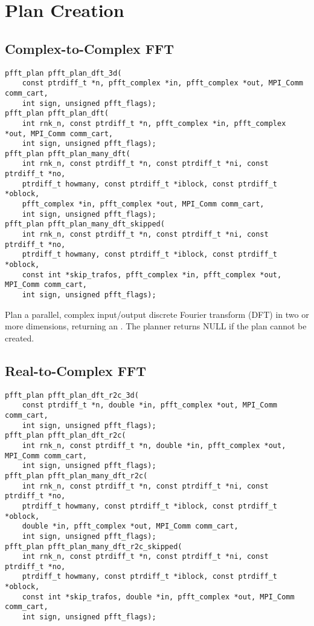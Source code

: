 \section{Plan Creation}\label{sec:create-plan}

\subsection{Complex-to-Complex FFT}
\begin{lstlisting}
pfft_plan pfft_plan_dft_3d(
    const ptrdiff_t *n, pfft_complex *in, pfft_complex *out, MPI_Comm comm_cart,
    int sign, unsigned pfft_flags);
pfft_plan pfft_plan_dft(
    int rnk_n, const ptrdiff_t *n, pfft_complex *in, pfft_complex *out, MPI_Comm comm_cart,
    int sign, unsigned pfft_flags);
pfft_plan pfft_plan_many_dft(
    int rnk_n, const ptrdiff_t *n, const ptrdiff_t *ni, const ptrdiff_t *no,
    ptrdiff_t howmany, const ptrdiff_t *iblock, const ptrdiff_t *oblock,
    pfft_complex *in, pfft_complex *out, MPI_Comm comm_cart,
    int sign, unsigned pfft_flags);
pfft_plan pfft_plan_many_dft_skipped(
    int rnk_n, const ptrdiff_t *n, const ptrdiff_t *ni, const ptrdiff_t *no,
    ptrdiff_t howmany, const ptrdiff_t *iblock, const ptrdiff_t *oblock,
    const int *skip_trafos, pfft_complex *in, pfft_complex *out, MPI_Comm comm_cart,
    int sign, unsigned pfft_flags);
\end{lstlisting}

Plan a parallel, complex input/output discrete Fourier transform (DFT) in two or more dimensions, returning an .
The planner returns NULL if the plan cannot be created.

\subsection{Real-to-Complex FFT}
\begin{lstlisting}
pfft_plan pfft_plan_dft_r2c_3d(
    const ptrdiff_t *n, double *in, pfft_complex *out, MPI_Comm comm_cart,
    int sign, unsigned pfft_flags);
pfft_plan pfft_plan_dft_r2c(
    int rnk_n, const ptrdiff_t *n, double *in, pfft_complex *out, MPI_Comm comm_cart,
    int sign, unsigned pfft_flags);
pfft_plan pfft_plan_many_dft_r2c(
    int rnk_n, const ptrdiff_t *n, const ptrdiff_t *ni, const ptrdiff_t *no,
    ptrdiff_t howmany, const ptrdiff_t *iblock, const ptrdiff_t *oblock,
    double *in, pfft_complex *out, MPI_Comm comm_cart,
    int sign, unsigned pfft_flags);
pfft_plan pfft_plan_many_dft_r2c_skipped(
    int rnk_n, const ptrdiff_t *n, const ptrdiff_t *ni, const ptrdiff_t *no,
    ptrdiff_t howmany, const ptrdiff_t *iblock, const ptrdiff_t *oblock,
    const int *skip_trafos, double *in, pfft_complex *out, MPI_Comm comm_cart,
    int sign, unsigned pfft_flags);
\end{lstlisting}

